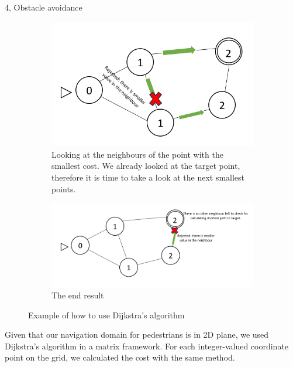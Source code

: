 \documentclass[10pt,a4paper]{article}
\begin{document}
\begin{task}{4, Obstacle avoidance}
\begin{figure}[H]
\begin{center}
\begin{subfigure}{0.6\textwidth}
 \centering
 \includegraphics[width=1\textwidth]{images/task4_dij_mod_2.png}
 \caption{Looking at the neighbours of the point with the smallest cost. We already looked at the target point, therefore it is time to take a look at the next smallest points.}

 \end{subfigure}
   \end{center}

   
\begin{center}
    

\begin{subfigure}{0.8\textwidth}
 \centering
 \includegraphics[width=1\textwidth]{images/task4_dij_mod_3.png}
 \caption{The end result}
 
 \end{subfigure}
 \end{center}

\caption{Example of how to use Dijkstra's algorithm}
 \label{fig:task4_dijmod}
\end{figure}

Given that our navigation domain for pedestrians is in 2D plane, we used Dijkstra's algorithm in a matrix framework. For each integer-valued coordinate point on the grid, we calculated the cost with the same method.


\end{task}
\end{document}
